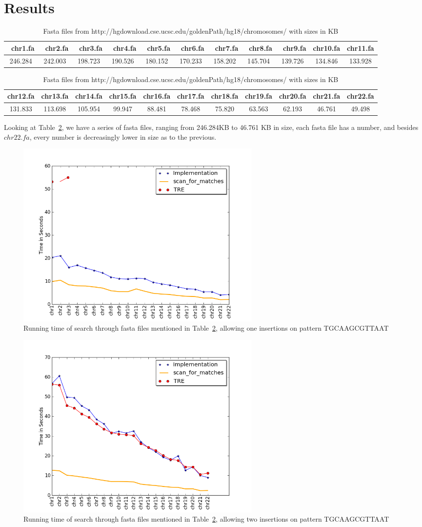 \section{Results}
\begin{table}[h!]
\begin{tabular}{ c | c | c |  c | c | c | c |  c | c | c |  c }
 ~chr1.fa & ~chr2.fa  & ~chr3.fa & ~chr4.fa & ~chr5.fa & ~chr6.fa &  ~chr7.fa & ~chr8.fa & ~chr9.fa & chr10.fa & chr11.fa \\
 \hline
246.284 & 242.003 & 198.723 & 190.526 & 180.152 & 170.233 & 158.202 & 145.704 & 139.726 & 134.846 & 133.928
\end{tabular}
\begin{tabular}{ c | c | c |  c | c | c | c |  c | c | c |  c }
chr12.fa & chr13.fa & chr14.fa & chr15.fa & chr16.fa & chr17.fa & chr18.fa & chr19.fa & chr20.fa & chr21.fa & chr22.fa\\
\hline
131.833 & 113.698 & 105.954 & 99.947 & 88.481 & 78.468 & 75.820 & 63.563 & 62.193 & 46.761 & 49.498
\end{tabular}
\caption{Fasta files from http://hgdownload.cse.ucsc.edu/goldenPath/hg18/chromosomes/ with sizes in KB}
\label{tab:sizes}
\end{table}
Looking at Table~\ref{tab:sizes}, we have a series of fasta files, ranging from 246.284KB to 46.761 KB in size, each fasta file has a number, and besides $chr22.fa$, every number is decreasingly lower in size as to the previous.

\begin{figure}[h!]
\centering
\includegraphics[width=0.6\textwidth]{Benchmarking/1ins.png}
\caption{Running time of search through fasta files mentioned in Table~\ref{tab:sizes},  allowing one insertions on pattern TGCAAGCGTTAAT}
\end{figure}

\begin{figure}[h!]
\centering
\includegraphics[width=0.6\textwidth]{Benchmarking/2ins.png}
\caption{Running time of search through fasta files mentioned in Table~\ref{tab:sizes},  allowing two insertions on pattern TGCAAGCGTTAAT}
\end{figure}
